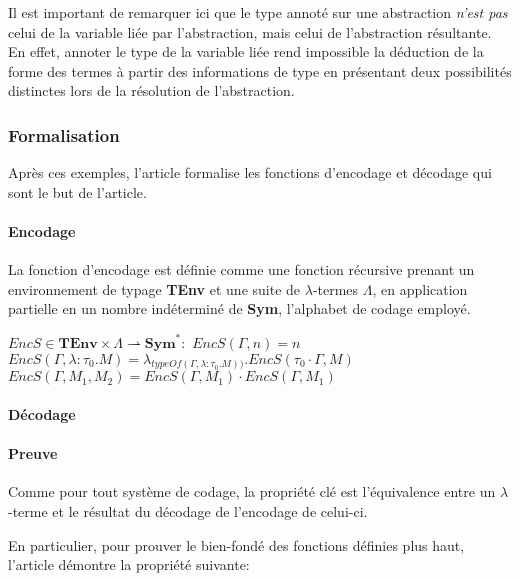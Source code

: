 \documentclass[titlepage]{article}
\let\oldparagraph\paragraph
\renewcommand{\paragraph}[1]{\oldparagraph{#1}\mbox{}}
\begin{document}
Il est important de remarquer ici que le type annoté sur une abstraction \emph{n'est pas} celui de la variable
liée par l'abstraction, mais celui de l'abstraction résultante. En effet, annoter le type de la variable liée
rend impossible la déduction de la forme des termes à partir des informations de type en présentant deux possibilités
distinctes lors de la résolution de l'abstraction.

\subsubsection{Formalisation}\label{formalisation}

Après ces exemples, l'article formalise les fonctions d'encodage et
décodage qui sont le but de l'article.

\paragraph{Encodage}\label{encodage}

La fonction d'encodage est définie comme une fonction récursive prenant
un environnement de typage \textbf{TEnv} et une suite de
\(\lambda\)-termes \(\Lambda\), en application partielle en un nombre
indéterminé de \textbf{Sym}, l'alphabet de codage employé.

\(EncS \in \textbf{TEnv} \times \Lambda \rightharpoonup \textbf{Sym}^*:\)
\newline
\(EncS(\Gamma, n) = n\) \newline
\(EncS(\Gamma, \lambda:\tau_0.M) = \lambda_{typeOf(\Gamma, \lambda:\tau_0.M))}.EncS(\tau_0 \cdot \Gamma, M)\)
\newline
\(EncS(\Gamma, M_1, M_2) = EncS(\Gamma, M_1) \cdot EncS(\Gamma, M_1)\)

\paragraph{Décodage}\label{duxe9codage}

\paragraph{Preuve}\label{preuve}

Comme pour tout système de codage, la propriété clé est l'équivalence
entre un \(\lambda\)-terme et le résultat du décodage de l'encodage de
celui-ci.

En particulier, pour prouver le bien-fondé des fonctions définies plus
haut, l'article démontre la propriété suivante:
\end{document}
